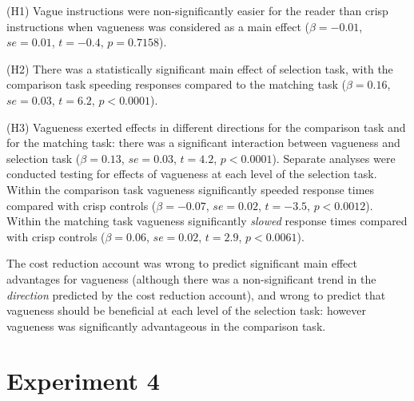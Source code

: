\documentclass[%
man,		%
floatsintext,%
apacite%
]{apa6}
\begin{document}
\begin{APAenumerate}
	\item [(H1)] Vague instructions were non-significantly easier for the reader than crisp instructions when vagueness was considered as a main effect ($\beta=-0.01$, $se=0.01$, $t=-0.4$, $p=0.7158$). 
	\item [(H2)] There was a statistically significant main effect of selection task, with the comparison task speeding responses compared to the matching task ($\beta=0.16$, $se=0.03$, $t=6.2$, $p<0.0001$). 
	\item [(H3)] Vagueness exerted effects in different directions for the comparison task and for the matching task: there was a significant interaction between vagueness and selection task ($\beta=0.13$, $se=0.03$, $t=4.2$, $p<0.0001$). 
Separate analyses were conducted testing for effects of vagueness at each level of the selection task.
Within the comparison task vagueness significantly speeded response times compared with crisp controls ($\beta=-0.07$, $se=0.02$, $t=-3.5$, $p<0.0012$). 
Within the matching task vagueness significantly \emph{slowed} response times compared with crisp controls ($\beta=0.06$, $se=0.02$, $t=2.9$, $p<0.0061$). 
\end{APAenumerate}

The cost reduction account was wrong to predict significant main effect advantages for vagueness (although there was a non-significant trend in the \emph{direction} predicted by the cost reduction account), and wrong to predict that vagueness should be beneficial at each level of the selection task: however vagueness was significantly advantageous in the comparison task.



\section{Experiment 4} %
\end{document}
